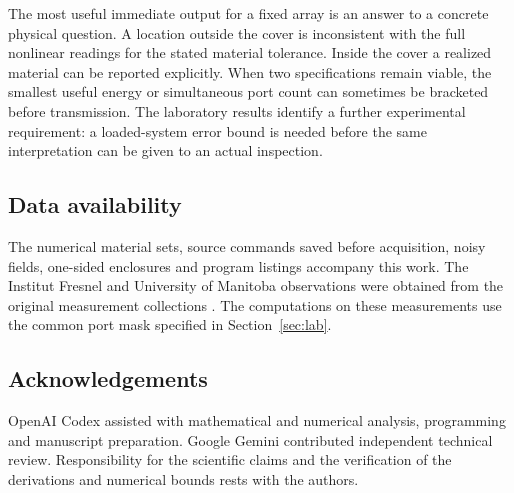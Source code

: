 The most useful immediate output for a fixed array is an answer to a concrete physical question. A location outside the cover is inconsistent with the full nonlinear readings for the stated material tolerance. Inside the cover a realized material can be reported explicitly. When two specifications remain viable, the smallest useful energy or simultaneous port count can sometimes be bracketed before transmission. The laboratory results identify a further experimental requirement: a loaded-system error bound is needed before the same interpretation can be given to an actual inspection.

\subsection*{Data availability}
The numerical material sets, source commands saved before acquisition, noisy fields, one-sided enclosures and program listings accompany this work. The Institut Fresnel and University of Manitoba observations were obtained from the original measurement collections \cite{fresnel,manitoba}. The computations on these measurements use the common port mask specified in Section~\ref{sec:lab}.
\subsection*{Acknowledgements}
OpenAI Codex assisted with mathematical and numerical analysis, programming and manuscript preparation. Google Gemini contributed independent technical review. Responsibility for the scientific claims and the verification of the derivations and numerical bounds rests with the authors.
